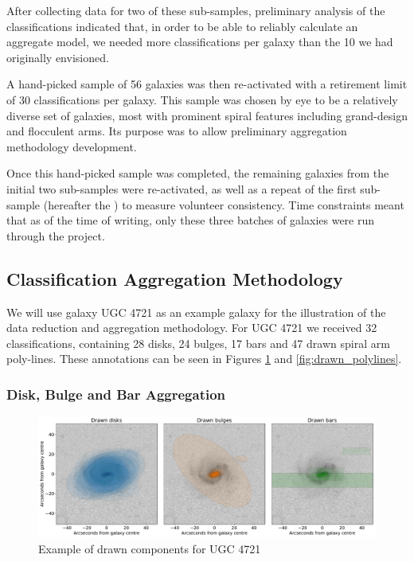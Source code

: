 \documentclass[../main.tex]{subfiles}
\begin{document}
After collecting data for two of these sub-samples, preliminary analysis of the classifications indicated that, in order to be able to reliably calculate an aggregate model, we needed more classifications per galaxy than the 10 we had originally envisioned.

A hand-picked sample of 56 galaxies was then re-activated with a retirement limit of 30 classifications per galaxy. This sample was chosen by eye to be a relatively diverse set of galaxies, most with prominent spiral features including grand-design and flocculent arms. Its purpose was to allow preliminary aggregation methodology development.

Once this hand-picked sample was completed, the remaining galaxies from the initial two sub-samples were re-activated, as well as a repeat of the first sub-sample (hereafter the ) to measure volunteer consistency. Time constraints meant that as of the time of writing, only these three batches of galaxies were run through the project.


\subsection{Classification Aggregation Methodology}

We will use galaxy UGC 4721 as an example galaxy for the illustration of the data reduction and aggregation methodology. For UGC 4721 we received 32 classifications, containing 28 disks, 24 bulges, 17 bars and 47 drawn spiral arm poly-lines. These annotations can be seen in Figures \ref{fig:drawn_shapes} and \ref{fig:drawn_polylines}.

\subsubsection{Disk, Bulge and Bar Aggregation}

\begin{figure}
  \includegraphics[width=15cm]{images__results/drawn_shapes.pdf}
  \caption{Example of drawn components for UGC 4721}
  \label{fig:drawn_shapes}
\end{figure}
\end{document}
